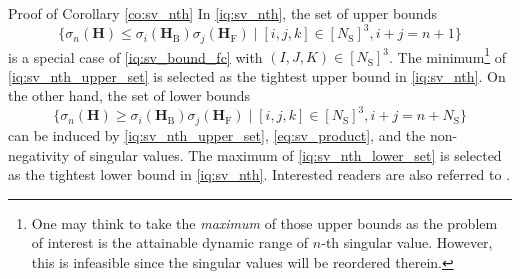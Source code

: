 \documentclass[journal]{IEEEtran}
\begin{document}
\begin{appendix}
	\begin{subsection}{Proof of Corollary \ref{co:sv_nth}}\label{ap:sv_nth}
		In \eqref{iq:sv_nth}, the set of upper bounds
		\begin{equation}
			\bigl\{\sigma_n(\mathbf{H}) \le \sigma_i(\mathbf{H}_\mathrm{B}) \sigma_j(\mathbf{H}_\mathrm{F}) \mid [i,j,k] \in [N_\mathrm{S}]^3, i+j=n+1\bigr\}
			\label{iq:sv_nth_upper_set}
		\end{equation}
		is a special case of \eqref{iq:sv_bound_fc} with $(I, J, K) \in [N_\mathrm{S}]^3$.
		The minimum\footnote{One may think to take the \emph{maximum} of those upper bounds as the problem of interest is the attainable dynamic range of $n$-th singular value. However, this is infeasible since the singular values will be reordered therein.} of \eqref{iq:sv_nth_upper_set} is selected as the tightest upper bound in \eqref{iq:sv_nth}.
		On the other hand, the set of lower bounds
		\begin{equation}
			\bigl\{\sigma_n(\mathbf{H}) \ge \sigma_i(\mathbf{H}_\mathrm{B}) \sigma_j(\mathbf{H}_\mathrm{F}) \mid [i,j,k] \in [N_\mathrm{S}]^3, i+j=n+N_\mathrm{S}\bigr\}
			\label{iq:sv_nth_lower_set}
		\end{equation}
		can be induced by \eqref{iq:sv_nth_upper_set}, \eqref{eq:sv_product}, and the non-negativity of singular values.
		The maximum of \eqref{iq:sv_nth_lower_set} is selected as the tightest lower bound in \eqref{iq:sv_nth}.
		Interested readers are also referred to \cite[(2.0.3)]{Zhang2005}.


\end{subsection}
\end{appendix}
\end{document}
